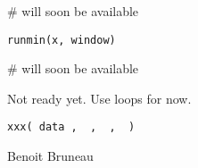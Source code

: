 \documentclass[a4paper]{book}
\begin{document}
%
\begin{Arguments}
\begin{ldescription}
\item[\code{x}] 


\item[\code{window}] 


\end{ldescription}
\end{Arguments}
%
\begin{Examples}
\begin{ExampleCode}
# will soon be available
\end{ExampleCode}
\end{Examples}
\newpage
{}
%
\begin{Usage}
\begin{verbatim}
runmin(x, window)
\end{verbatim}
\end{Usage}
%
\begin{Arguments}
\begin{ldescription}
\item[\code{x}] 


\item[\code{window}] 


\end{ldescription}
\end{Arguments}
%
\begin{Examples}
\begin{ExampleCode}
# will soon be available
\end{ExampleCode}
\end{Examples}
\newpage
{}
%
\begin{Description}\relax
Not ready yet. Use  loops for now.
\end{Description}
%
\begin{Usage}
\begin{verbatim}
xxx( data ,  ,  ,  )
\end{verbatim}
\end{Usage}
%
\begin{Arguments}
\begin{ldescription}
\item[\code{data}] 


\end{ldescription}
\end{Arguments}
%
\begin{Author}\relax
Benoit Bruneau
\end{Author}
\end{document}
